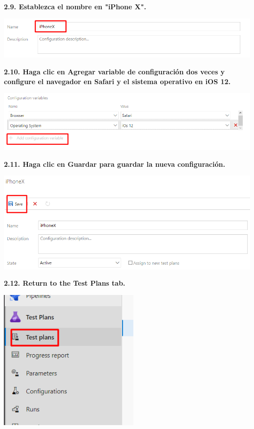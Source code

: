\documentclass{article}
\begin{document}
\textbf{2.9. Establezca el nombre en "iPhone X".}

    \begin{center}
		\includegraphics[width=14cm]{./images/2.13} 
	\end{center}
	
\textbf{2.10. Haga clic en Agregar variable de configuración dos veces y configure el navegador en Safari y el sistema operativo en iOS 12.}

    \begin{center}
		\includegraphics[width=14cm]{./images/2.14} 
	\end{center}
	
\textbf{2.11. Haga clic en Guardar para guardar la nueva configuración.}

    \begin{center}
		\includegraphics[width=14cm]{./images/2.15} 
	\end{center}
	
\textbf{2.12. Return to the Test Plans tab.}

    \begin{center}
		\includegraphics[width=7cm]{./images/2.16} 
	\end{center}
	
\end{document}
